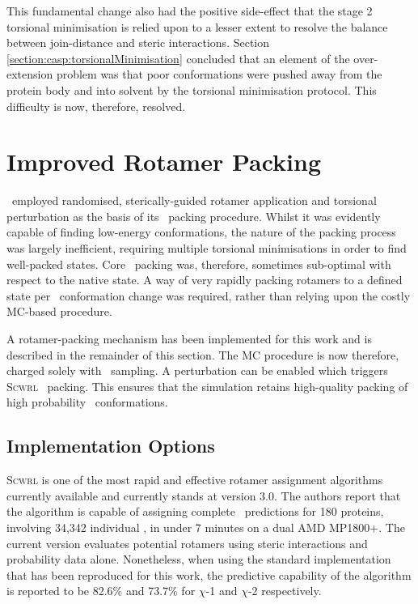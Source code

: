This fundamental change also had the positive side-effect that the stage 2 torsional minimisation is relied upon to a lesser extent to resolve the balance between join-distance and steric interactions. Section \ref{section:casp:torsionalMinimisation} concluded that an element of the over-extension problem was that poor conformations were pushed away from the protein body and into solvent by the torsional minimisation protocol. This difficulty is now, therefore, resolved.


\section{Improved Rotamer Packing}
\label{section:arcus:impRotPack}

\prearcus\ employed randomised, sterically-guided rotamer application and torsional perturbation as the basis of its \sidechain\ packing procedure. Whilst it was evidently capable of finding low-energy conformations, the nature of the packing process was largely inefficient, requiring multiple torsional minimisations in order to find well-packed states. Core \sidechain\ packing was, therefore, sometimes sub-optimal with respect to the native state. A way of very rapidly packing rotamers to a defined state per \mainchain\ conformation change was required, rather than relying upon the costly MC-based procedure. 

A rotamer-packing mechanism has been implemented for this work and is described in the remainder of this section. The MC procedure is now therefore, charged solely with \mainchain\ sampling. A perturbation can be enabled which triggers \textsc{Scwrl} \sidechain\ packing. This ensures that the simulation retains high-quality packing of high probability \sidechain\ conformations.

\subsection{Implementation Options}

\textsc{Scwrl}\cite{METHOD:SCWRL_1} is one of the most rapid and effective rotamer assignment algorithms currently available and currently stands at version 3.0\cite{METHOD:SCWRL_2}.
The authors report that the algorithm is capable of assigning complete \sidechain\ predictions for 180 proteins, involving 34,342 individual \sidechains, in under 7 minutes on a dual AMD MP1800+. The current version evaluates potential rotamers using steric interactions and probability data alone. Nonetheless, when using the standard implementation that has been reproduced for this work, the predictive capability of the algorithm is reported to be 82.6\% and 73.7\% for $\chi$-1 and $\chi$-2 respectively.

